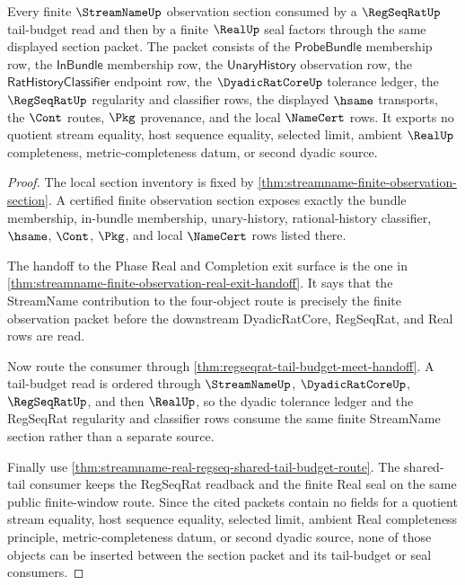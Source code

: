 \begin{theorem}
\label{thm:streamname-finite-observation-regseqrat-tail-budget-section-lock}
Every finite $\StreamNameUp$ observation section consumed by a
$\RegSeqRatUp$ tail-budget read and then by a finite $\RealUp$ seal factors
through the same displayed section packet. The packet consists of the
$\mathsf{ProbeBundle}$ membership row, the $\mathsf{InBundle}$ membership row,
the $\mathsf{UnaryHistory}$ observation row, the
$\mathsf{RatHistoryClassifier}$ endpoint row, the $\DyadicRatCoreUp$ tolerance
ledger, the $\RegSeqRatUp$ regularity and classifier rows, the displayed
$\hsame$ transports, the $\Cont$ routes, $\Pkg$ provenance, and the local
$\NameCert$ rows. It exports no quotient stream equality, host sequence
equality, selected limit, ambient $\RealUp$ completeness, metric-completeness
datum, or second dyadic source.
\end{theorem}
\begin{proof}
The local section inventory is fixed by
\autoref{thm:streamname-finite-observation-section}. A certified finite
observation section exposes exactly the bundle membership, in-bundle
membership, unary-history, rational-history classifier, $\hsame$, $\Cont$,
$\Pkg$, and local $\NameCert$ rows listed there.

The handoff to the Phase Real and Completion exit surface is the one in
\autoref{thm:streamname-finite-observation-real-exit-handoff}. It says that the
StreamName contribution to the four-object route is precisely the finite
observation packet before the downstream DyadicRatCore, RegSeqRat, and Real
rows are read.

Now route the consumer through
\autoref{thm:regseqrat-tail-budget-meet-handoff}. A tail-budget read is ordered
through $\StreamNameUp$, $\DyadicRatCoreUp$, $\RegSeqRatUp$, and then
$\RealUp$, so the dyadic tolerance ledger and the RegSeqRat regularity and
classifier rows consume the same finite StreamName section rather than a
separate source.

Finally use
\autoref{thm:streamname-real-regseq-shared-tail-budget-route}. The shared-tail
consumer keeps the RegSeqRat readback and the finite Real seal on the same
public finite-window route. Since the cited packets contain no fields for a
quotient stream equality, host sequence equality, selected limit, ambient Real
completeness principle, metric-completeness datum, or second dyadic source,
none of those objects can be inserted between the section packet and its
tail-budget or seal consumers.
\end{proof}


